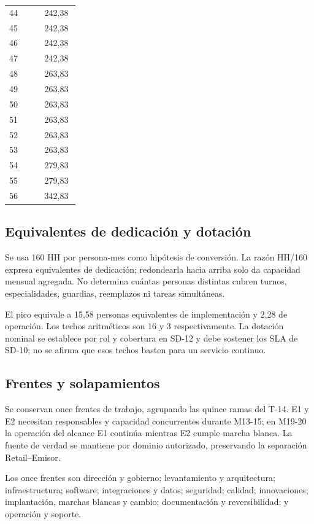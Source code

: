 \begin{longtable}{@{}p{0.465\linewidth}p{0.465\linewidth}@{}}
44 & 242,38 \\
45 & 242,38 \\
46 & 242,38 \\
47 & 242,38 \\
48 & 263,83 \\
49 & 263,83 \\
50 & 263,83 \\
51 & 263,83 \\
52 & 263,83 \\
53 & 263,83 \\
54 & 279,83 \\
55 & 279,83 \\
56 & 342,83 \\
\end{longtable}

\subsection{Equivalentes de dedicación y dotación}

Se usa 160 HH por persona-mes como hipótesis de conversión. La razón HH/160 expresa equivalentes de dedicación; redondearla hacia arriba solo da capacidad mensual agregada. No determina cuántas personas distintas cubren turnos, especialidades, guardias, reemplazos ni tareas simultáneas.

El pico equivale a 15,58 personas equivalentes de implementación y 2,28 de operación. Los techos aritméticos son 16 y 3 respectivamente. La dotación nominal se establece por rol y cobertura en SD-12 y debe sostener los SLA de SD-10; no se afirma que esos techos basten para un servicio continuo.

\subsection{Frentes y solapamientos}

Se conservan once frentes de trabajo, agrupando las quince ramas del T-14. E1 y E2 necesitan responsables y capacidad concurrentes durante M13-15; en M19-20 la operación del alcance E1 continúa mientras E2 cumple marcha blanca. La fuente de verdad se mantiene por dominio autorizado, preservando la separación Retail–Emisor.


Los once frentes son dirección y gobierno; levantamiento y arquitectura; infraestructura; software; integraciones y datos; seguridad; calidad; innovaciones; implantación, marchas blancas y cambio; documentación y reversibilidad; y operación y soporte.

